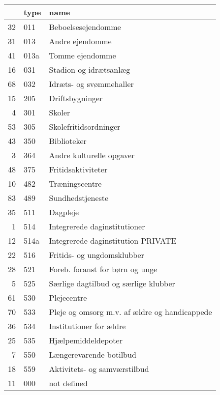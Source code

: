 \begin{table}[ht]
\centering
\begin{tabular}{rll}
  \hline
 & type & name \\ 
  \hline
32 & 011 &  Beboelsesejendomme \\ 
  31 & 013 &  Andre ejendomme \\ 
  41 & 013a &  Tomme ejendomme \\ 
  16 & 031 &  Stadion og idrætsanlæg \\ 
  68 & 032 &  Idræts- og svømmehaller \\ 
  15 & 205 &  Driftsbygninger \\ 
  4 & 301 &  Skoler \\ 
  53 & 305 &  Skolefritidsordninger \\ 
  43 & 350 &  Biblioteker \\ 
  3 & 364 &  Andre kulturelle opgaver \\ 
  48 & 375 &  Fritidsaktiviteter \\ 
  10 & 482 & Træningscentre \\ 
  83 & 489 & Sundhedstjeneste \\ 
  35 & 511 &  Dagpleje \\ 
  1 & 514 &  Integrerede daginstitutioner \\ 
  12 & 514a &  Integrerede daginstitution PRIVATE \\ 
  22 & 516 &  Fritids- og ungdomsklubber \\ 
  28 & 521 &  Foreb. foranst for børn og unge \\ 
  5 & 525 & Særlige dagtilbud og særlige klubber \\ 
  61 & 530 & Plejecentre \\ 
  70 & 533 & Pleje og omsorg m.v. af ældre og handicappede \\ 
  36 & 534 &  Institutioner for ældre \\ 
  25 & 535 & Hjælpemiddeldepoter \\ 
  7 & 550 & Længerevarende botilbud \\ 
  18 & 559 &  Aktivitets- og samværstilbud \\ 
  11 & 000 & not defined \\ 
   \hline
\end{tabular}
\end{table}
